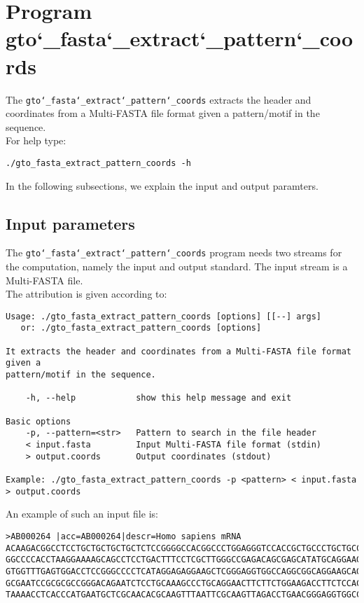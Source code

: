 \section{Program gto\char`_fasta\char`_extract\char`_pattern\char`_coords}
The \texttt{gto\char`_fasta\char`_extract\char`_pattern\char`_coords} extracts the header and coordinates from a Multi-FASTA file format given a pattern/motif in the sequence. \\
For help type:
\begin{lstlisting}
./gto_fasta_extract_pattern_coords -h
\end{lstlisting}
In the following subsections, we explain the input and output paramters.

\subsection*{Input parameters}

The \texttt{gto\char`_fasta\char`_extract\char`_pattern\char`_coords} program needs two streams for the computation, namely the input and output standard. The input stream is a Multi-FASTA  file.\\
The attribution is given according to:
\begin{lstlisting}
Usage: ./gto_fasta_extract_pattern_coords [options] [[--] args]
   or: ./gto_fasta_extract_pattern_coords [options]

It extracts the header and coordinates from a Multi-FASTA file format given a 
pattern/motif in the sequence.

    -h, --help            show this help message and exit

Basic options
    -p, --pattern=<str>   Pattern to search in the file header
    < input.fasta         Input Multi-FASTA file format (stdin)
    > output.coords       Output coordinates (stdout)

Example: ./gto_fasta_extract_pattern_coords -p <pattern> < input.fasta > output.coords
\end{lstlisting}
An example of such an input file is:
\begin{lstlisting}
>AB000264 |acc=AB000264|descr=Homo sapiens mRNA 
ACAAGACGGCCTCCTGCTGCTGCTGCTCTCCGGGGCCACGGCCCTGGAGGGTCCACCGCTGCCCTGCTGCCATTGTCCCC
GGCCCCACCTAAGGAAAAGCAGCCTCCTGACTTTCCTCGCTTGGGCCGAGACAGCGAGCATATGCAGGAAGCGGCAGGAA
GTGGTTTGAGTGGACCTCCGGGCCCCTCATAGGAGAGGAAGCTCGGGAGGTGGCCAGGCGGCAGGAAGCAGGCCAGTGCC
GCGAATCCGCGCGCCGGGACAGAATCTCCTGCAAAGCCCTGCAGGAACTTCTTCTGGAAGACCTTCTCCACCCCCCCAGC
TAAAACCTCACCCATGAATGCTCGCAACACGCAAGTTTAATTCGCAAGTTAGACCTGAACGGGAGGTGGCCACGCAAGTT
\end{lstlisting}

